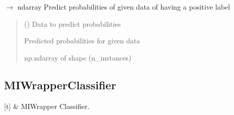 \documentclass[letterpaper,10pt,english]{sphinxmanual}
\begin{document}
\begin{fulllineitems}
\begin{fulllineitems}
\label{\detokenize{classifier/mi/_autosummary/miml.classifier.mi.apr_classifier.APRClassifier:miml.classifier.mi.apr_classifier.APRClassifier.predict_proba}}
\pysigstartsignatures
\pysiglinewithargsret
{}
{}
{{ $\rightarrow$ ndarray}}
\pysigstopsignatures
\sphinxAtStartPar
Predict probabilities of given data of having a positive label
\begin{quote}\begin{description}
\sphinxAtStartPar
{} (\sphinxstyleliteralemphasis{\sphinxupquote{ (}}\sphinxstyleliteralemphasis{\sphinxupquote{, }}\sphinxstyleliteralemphasis{\sphinxupquote{, }}\sphinxstyleliteralemphasis{\sphinxupquote{)}}) \textendash{} Data to predict probabilities

\sphinxAtStartPar
{} \textendash{} Predicted probabilities for given data

\sphinxAtStartPar
np.ndarray of shape (n\_instances)

\end{description}\end{quote}

\end{fulllineitems}


\end{fulllineitems}


\sphinxstepscope


\subsection{MIWrapperClassifier}
\label{\detokenize{classifier/mi/mi_wrapper_classifier:miwrapperclassifier}}\label{\detokenize{classifier/mi/mi_wrapper_classifier::doc}}

\begin{savenotes}\sphinxattablestart
\sphinxthistablewithglobalstyle
\sphinxthistablewithnovlinesstyle
\centering
\begin{tabulary}{\linewidth}[t]{}
\sphinxtoprule
\sphinxtableatstartofbodyhook
\sphinxAtStartPar
{\hyperref[\detokenize{classifier/mi/_autosummary/miml.classifier.mi.mi_wrapper_classifier.MIWrapperClassifier:miml.classifier.mi.mi_wrapper_classifier.MIWrapperClassifier}]{}}
&
\sphinxAtStartPar
MIWrapper Classifier.
\\
\sphinxbottomrule
\end{tabulary}
\sphinxtableafterendhook\par
\sphinxattableend\end{savenotes}
\end{document}
